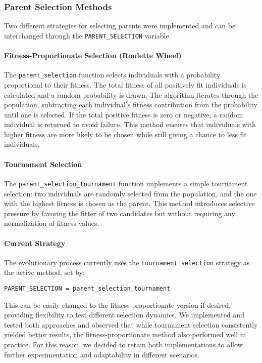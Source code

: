 \documentclass{article}
\begin{document}
\subsubsection{Parent Selection Methods}

Two different strategies for selecting parents were implemented and can be interchanged through the \texttt{PARENT\_SELECTION} variable.

\paragraph{Fitness-Proportionate Selection (Roulette Wheel)}
The \texttt{parent\_selection} function selects individuals with a probability proportional to their fitness. The total fitness of all positively fit individuals is calculated and a random probability is drawn. The algorithm iterates through the population, subtracting each individual's fitness contribution from the probability until one is selected. If the total positive fitness is zero or negative, a random individual is returned to avoid failure. This method ensures that individuals with higher fitness are more likely to be chosen while still giving a chance to less fit individuals.

\paragraph{Tournament Selection}
The \texttt{parent\_selection\_tournament} function implements a simple tournament selection: two individuals are randomly selected from the population, and the one with the highest fitness is chosen as the parent. This method introduces selective pressure by favoring the fitter of two candidates but without requiring any normalization of fitness values.

\paragraph{Current Strategy}
The evolutionary process currently uses the \texttt{tournament selection} strategy as the active method, set by:
\begin{verbatim}
PARENT_SELECTION = parent_selection_tournament
\end{verbatim}
This can be easily changed to the fitness-proportionate version if desired, providing flexibility to test different selection dynamics. We implemented and tested both approaches and observed that while tournament selection consistently yielded better results, the fitness-proportionate method also performed well in practice. For this reason, we decided to retain both implementations to allow further experimentation and adaptability in different scenarios.
\end{document}
